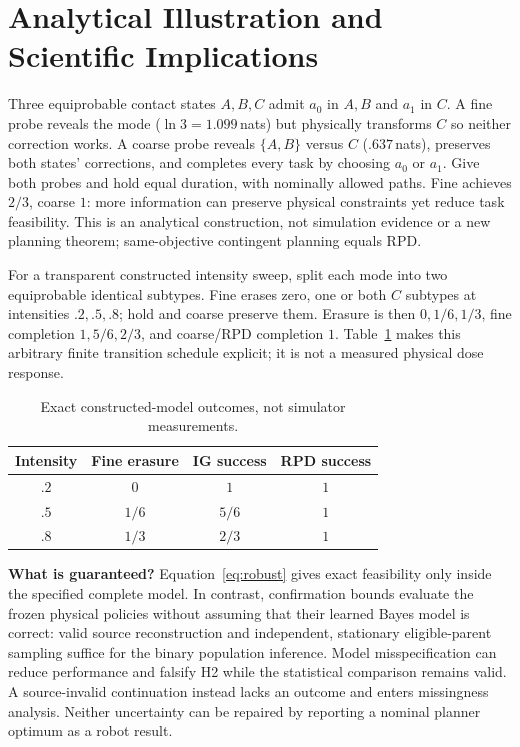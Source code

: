 \section{Analytical Illustration and Scientific Implications}
Three equiprobable contact states $A,B,C$ admit $a_0$ in $A,B$ and $a_1$ in $C$. A fine probe reveals the mode ($\ln3=1.099$\,nats) but physically transforms $C$ so neither correction works. A coarse probe reveals $\{A,B\}$ versus $C$ ($.637$\,nats), preserves both states' corrections, and completes every task by choosing $a_0$ or $a_1$. Give both probes and hold equal duration, with nominally allowed paths. Fine achieves $2/3$, coarse $1$: more information can preserve physical constraints yet reduce task feasibility. This is an analytical construction, not simulation evidence or a new planning theorem; same-objective contingent planning equals RPD.

For a transparent constructed intensity sweep, split each mode into two equiprobable identical subtypes. Fine erases zero, one or both $C$ subtypes at intensities $.2,.5,.8$; hold and coarse preserve them. Erasure is then $0, 1/6, 1/3$, fine completion $1, 5/6, 2/3$, and coarse/RPD completion $1$. Table~\ref{tab:finite} makes this arbitrary finite transition schedule explicit; it is not a measured physical dose response.

\begin{table}[t]\centering
\caption{Exact constructed-model outcomes, not simulator measurements.}\label{tab:finite}
\begin{tabular}{cccc}\toprule
Intensity & Fine erasure & IG success & RPD success\\\midrule
$.2$ & $0$ & $1$ & $1$\\
$.5$ & $1/6$ & $5/6$ & $1$\\
$.8$ & $1/3$ & $2/3$ & $1$\\\bottomrule
\end{tabular}
\end{table}

\textbf{What is guaranteed?} Equation~\eqref{eq:robust} gives exact feasibility only inside the specified complete model. In contrast, confirmation bounds evaluate the frozen physical policies without assuming that their learned Bayes model is correct: valid source reconstruction and independent, stationary eligible-parent sampling suffice for the binary population inference. Model misspecification can reduce performance and falsify H2 while the statistical comparison remains valid. A source-invalid continuation instead lacks an outcome and enters missingness analysis. Neither uncertainty can be repaired by reporting a nominal planner optimum as a robot result.

